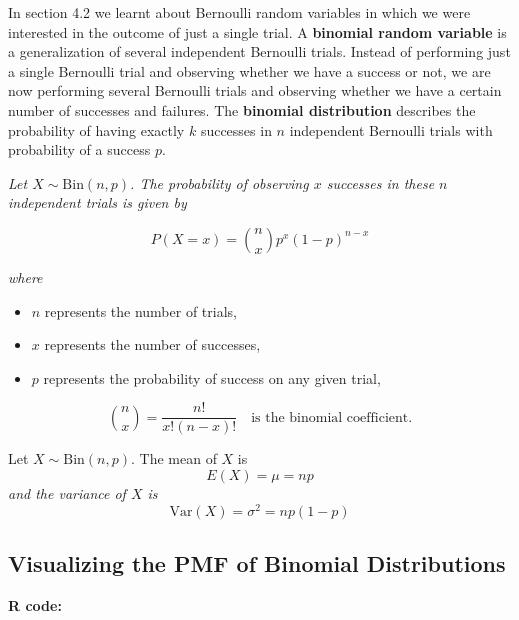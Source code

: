 In section 4.2 we learnt about Bernoulli random variables in which we were interested in the outcome of just a single trial. A \textbf{binomial random variable} is a generalization of several independent Bernoulli trials. Instead of performing just a single Bernoulli trial and observing whether we have a success or not, we are now performing several Bernoulli trials and observing whether we have a certain number of successes and failures. The \textbf{binomial distribution} describes the probability of having exactly \( k \) successes in \( n \) independent Bernoulli trials with probability of a success \( p \). \\
\begin{tcolorbox}[
  colback=yellow!10,
  colframe=yellow!10,
  boxrule=0pt,
  sharp corners=south,
  enhanced,
  breakable]

\textit{Let \( X \sim \text{Bin}(n, p) \). The probability of observing \( x \) successes in these \( n \) independent trials is given by}

\[
P(X = x) = \binom{n}{x} p^x (1 - p)^{n - x}
\]

\textit{where}
\begin{itemize}
  \item \( n \) represents the number of trials,
  \item \( x \) represents the number of successes,
  \item \( p \) represents the probability of success on any given trial,
\end{itemize}

\[
\binom{n}{x} = \frac{n!}{x!(n - x)!} \quad \text{is the binomial coefficient.}
\]

\end{tcolorbox}

\begin{definition}
Let \( X \sim \text{Bin}(n, p) \). The mean of \( X \) is
\[
E(X) = \mu = np
\]
\textit{and the variance of \( X \) is}
\[
\text{Var}(X) = \sigma^2 = np(1 - p)
\]
\end{definition}



\subsection{Visualizing the PMF of Binomial Distributions}

\noindent\textcolor{gray!40}{\textbf{R code:}}

\vspace{0.5em}


